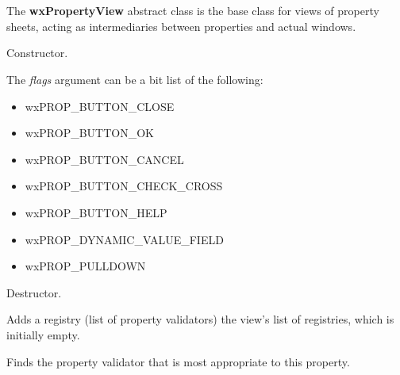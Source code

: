 \section{}\label{wxpropertyview}

The {\bf wxPropertyView} abstract class is the base class for views
of property sheets, acting as intermediaries between properties and
actual windows.






Constructor.

The {\it flags} argument can be a bit list of the following:

\begin{itemize}\itemsep=0pt
\item wxPROP\_BUTTON\_CLOSE
\item wxPROP\_BUTTON\_OK
\item wxPROP\_BUTTON\_CANCEL
\item wxPROP\_BUTTON\_CHECK\_CROSS
\item wxPROP\_BUTTON\_HELP
\item wxPROP\_DYNAMIC\_VALUE\_FIELD
\item wxPROP\_PULLDOWN
\end{itemize}



Destructor.

\label{wxpropertyviewaddregistry}


Adds a registry (list of property validators) the view's list of registries, which is initially empty.

\label{wxpropertyviewfindpropertyvalidator}


Finds the property validator that is most appropriate to this property.

